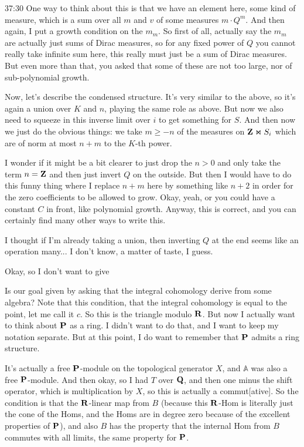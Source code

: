 \begin{unfinished}{37:30}
One way to think about this is that we have an element here, some kind of measure, which is a sum over all $m$ and $v$ of some measures $m \cdot Q^m$. And then again, I put a growth condition on the $m_m$. So first of all, actually say the $m_m$ are actually just sums of Dirac measures, so for any fixed power of $Q$ you cannot really take infinite sum here, this really must just be a sum of Dirac measures. But even more than that, you asked that some of these are not too large, nor of sub-polynomial growth.

Now, let's describe the condensed structure. It's very similar to the above, so it's again a union over $K$ and $n$, playing the same role as above. But now we also need to squeeze in this inverse limit over $i$ to get something for $S$. And then now we just do the obvious things: we take $m \geq -n$ of the measures on $\Z \Join S_i$ which are of norm at most $n + m$ to the $K$-th power.

I wonder if it might be a bit clearer to just drop the $n > 0$ and only take the term $n = \Z$ and then just invert $Q$ on the outside. But then I would have to do this funny thing where I replace $n + m$ here by something like $n + 2$ in order for the zero coefficients to be allowed to grow. Okay, yeah, or you could have a constant $C$ in front, like polynomial growth. Anyway, this is correct, and you can certainly find many other ways to write this.

I thought if I'm already taking a union, then inverting $Q$ at the end seems like an operation many... I don't know, a matter of taste, I guess.

Okay, so I don't want to give

Is our goal given by asking that the integral cohomology derive from some algebra? Note that this condition, that the integral cohomology is equal to the point, let me call it $c$. So this is the triangle modulo $\R$. But now I actually want to think about $\P$ as a ring. I didn't want to do that, and I want to keep my notation separate. But at this point, I do want to remember that $\P$ admits a ring structure.

It's actually a free $\P$-module on the topological generator $X$, and $\mathbb{A}$ was also a free $\P$-module. And then okay, so I had $T$ over $\Q$, and then one minus the shift operator, which is multiplication by $X$, so this is actually a commut[ative]. So the condition is that the $\R$-linear map from $B$ (because this $\R$-Hom is literally just the cone of the Homs, and the Homs are in degree zero because of the excellent properties of $\P$), and also $B$ has the property that the internal Hom from $B$ commutes with all limits, the same property for $\P$.


\end{unfinished}
